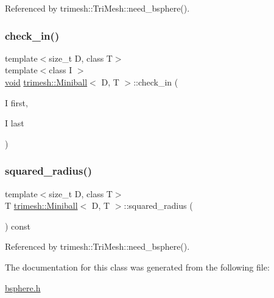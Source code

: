 Referenced by trimesh\+::\+Tri\+Mesh\+::need\+\_\+bsphere().

\mbox{\label{classtrimesh_1_1Miniball_af8f5930b697218850797afb8d26f2cdf}} 
\subsubsection{\texorpdfstring{check\+\_\+in()}{check\_in()}\hspace{0.1cm}{\footnotesize\ttfamily [2/2]}}
{\footnotesize\ttfamily template$<$size\+\_\+t D, class T$>$ \\
template$<$class I $>$ \\
\hyperlink{namespacetrimesh_a784ddfd979e1c579bda795a8edfc3f43}{void} \hyperlink{classtrimesh_1_1Miniball}{trimesh\+::\+Miniball}$<$ D, T $>$\+::check\+\_\+in (\begin{DoxyParamCaption}\item[{I}]{first,  }\item[{I}]{last }\end{DoxyParamCaption})\hspace{0.3cm}{\ttfamily [inline]}}

\mbox{\label{classtrimesh_1_1Miniball_ad1db83272bb094fdec06c4376dca19c5}} 
\subsubsection{\texorpdfstring{squared\+\_\+radius()}{squared\_radius()}}
{\footnotesize\ttfamily template$<$size\+\_\+t D, class T$>$ \\
T \hyperlink{classtrimesh_1_1Miniball}{trimesh\+::\+Miniball}$<$ D, T $>$\+::squared\+\_\+radius (\begin{DoxyParamCaption}{ }\end{DoxyParamCaption}) const\hspace{0.3cm}{\ttfamily [inline]}}



Referenced by trimesh\+::\+Tri\+Mesh\+::need\+\_\+bsphere().



The documentation for this class was generated from the following file\+:\begin{DoxyCompactItemize}
\item 
\hyperlink{bsphere_8h}{bsphere.\+h}\end{DoxyCompactItemize}
